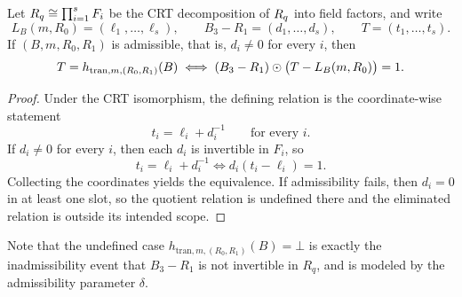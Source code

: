 \begin{lemma}\label{lem:hash-cleared-admissible}
Let
$R_q \cong \prod_{i=1}^s F_i$
be the CRT decomposition of \(R_q\) into field factors, and write
\[
L_B(m,R_0)=(\ell_1,\ldots,\ell_s),\qquad
B_3-R_1=(d_1,\ldots,d_s),\qquad
T=(t_1,\ldots,t_s).
\]
If \((B,m,R_0,R_1)\) is admissible, that is, \(d_i\neq 0\) for every \(i\), then
\[
T=h_{\mathrm{tran},m,(R_0,R_1)}(B)
\iff
(B_3-R_1)\odot\bigl(T-L_B(m,R_0)\bigr)=1.
\]
\end{lemma}

\begin{proof}
Under the CRT isomorphism, the defining relation is the coordinate-wise statement
\[
t_i=\ell_i+d_i^{-1}
\qquad\text{for every }i.
\]
If \(d_i\neq 0\) for every \(i\), then each \(d_i\) is invertible in \(F_i\), so
\[
t_i=\ell_i+d_i^{-1}
\iff
d_i(t_i-\ell_i)=1.
\]
Collecting the coordinates yields the equivalence. If admissibility fails, then \(d_i=0\) in
at least one slot, so the quotient relation is undefined there and the eliminated relation is outside its intended
scope.
\end{proof}

Note that the undefined case \(h_{\mathrm{tran},m,(R_0,R_1)}(B)=\bot\) is exactly the inadmissibility event
that \(B_3-R_1\) is not invertible in \(R_q\), and is modeled by the admissibility parameter \(\delta\).

